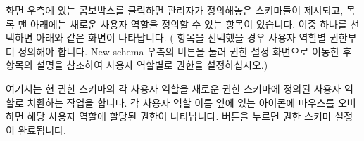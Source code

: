 \documentclass[letterpaper,10pt,english]{sphinxmanual}
\begin{document}
화면 우측에 있는  콤보박스를 클릭하면 관리자가 정의해놓은 스키마들이 제시되고, 목록 맨 아래에는 새로운 사용자 역할을 정의할 수 있는  항목이 있습니다. 이중 하나를 선택하면 아래와 같은 화면이 나타납니다. ( 항목을 선택했을 경우 사용자 역할별 권한부터 정의해야 합니다. New schema 우측의  버튼을 눌러 권한 설정 화면으로 이동한 후 {\hyperref[\detokenize{discovery/part03/shared_workspace:permission-schema-view}]{}} 항목의 설명을 참조하여 사용자 역할별로 권한을 설정하십시오.)
\begin{quote}

\begin{figure}[H]
\centering

\noindent{}
\end{figure}
\end{quote}

여기서는 현 권한 스키마의 각 사용자 역할을 새로운 권한 스키마에 정의된 사용자 역할로 치환하는 작업을 합니다. 각 사용자 역할 이름 옆에 있는  아이콘에 마우스를 오버하면 해당 사용자 역할에 할당된 권한이 나타납니다.  버튼을 누르면 권한 스키마 설정이 완료됩니다.
\end{document}
